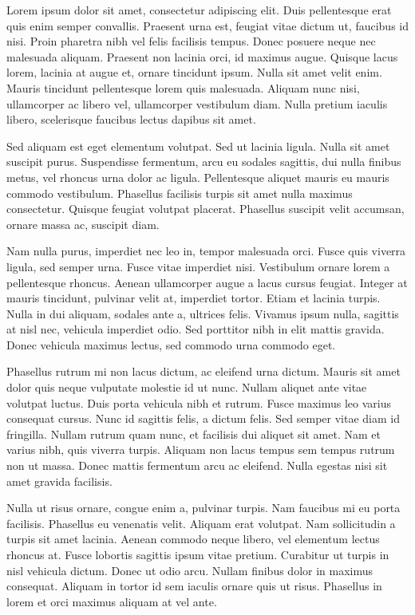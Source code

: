 
Lorem ipsum dolor sit amet, consectetur adipiscing elit. Duis pellentesque erat quis enim semper convallis. Praesent urna est, feugiat vitae dictum ut, faucibus id nisi. Proin pharetra nibh vel felis facilisis tempus. Donec posuere neque nec malesuada aliquam. Praesent non lacinia orci, id maximus augue. Quisque lacus lorem, lacinia at augue et, ornare tincidunt ipsum. Nulla sit amet velit enim. Mauris tincidunt pellentesque lorem quis malesuada. Aliquam nunc nisi, ullamcorper ac libero vel, ullamcorper vestibulum diam. Nulla pretium iaculis libero, scelerisque faucibus lectus dapibus sit amet.

Sed aliquam est eget elementum volutpat. Sed ut lacinia ligula. Nulla sit amet suscipit purus. Suspendisse fermentum, arcu eu sodales sagittis, dui nulla finibus metus, vel rhoncus urna dolor ac ligula. Pellentesque aliquet mauris eu mauris commodo vestibulum. Phasellus facilisis turpis sit amet nulla maximus consectetur. Quisque feugiat volutpat placerat. Phasellus suscipit velit accumsan, ornare massa ac, suscipit diam.

Nam nulla purus, imperdiet nec leo in, tempor malesuada orci. Fusce quis viverra ligula, sed semper urna. Fusce vitae imperdiet nisi. Vestibulum ornare lorem a pellentesque rhoncus. Aenean ullamcorper augue a lacus cursus feugiat. Integer at mauris tincidunt, pulvinar velit at, imperdiet tortor. Etiam et lacinia turpis. Nulla in dui aliquam, sodales ante a, ultrices felis. Vivamus ipsum nulla, sagittis at nisl nec, vehicula imperdiet odio. Sed porttitor nibh in elit mattis gravida. Donec vehicula maximus lectus, sed commodo urna commodo eget.

Phasellus rutrum mi non lacus dictum, ac eleifend urna dictum. Mauris sit amet dolor quis neque vulputate molestie id ut nunc. Nullam aliquet ante vitae volutpat luctus. Duis porta vehicula nibh et rutrum. Fusce maximus leo varius consequat cursus. Nunc id sagittis felis, a dictum felis. Sed semper vitae diam id fringilla. Nullam rutrum quam nunc, et facilisis dui aliquet sit amet. Nam et varius nibh, quis viverra turpis. Aliquam non lacus tempus sem tempus rutrum non ut massa. Donec mattis fermentum arcu ac eleifend. Nulla egestas nisi sit amet gravida facilisis.

Nulla ut risus ornare, congue enim a, pulvinar turpis. Nam faucibus mi eu porta facilisis. Phasellus eu venenatis velit. Aliquam erat volutpat. Nam sollicitudin a turpis sit amet lacinia. Aenean commodo neque libero, vel elementum lectus rhoncus at. Fusce lobortis sagittis ipsum vitae pretium. Curabitur ut turpis in nisl vehicula dictum. Donec ut odio arcu. Nullam finibus dolor in maximus consequat. Aliquam in tortor id sem iaculis ornare quis ut risus. Phasellus in lorem et orci maximus aliquam at vel ante.



